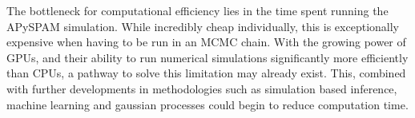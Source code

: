 The bottleneck for computational efficiency lies in the time spent running the APySPAM simulation. While incredibly cheap individually, this is exceptionally expensive when having to be run in an MCMC chain. With the growing power of GPUs, and their ability to run numerical simulations significantly more efficiently than CPUs, a pathway to solve this limitation may already exist. This, combined with further developments in methodologies such as simulation based inference, machine learning and gaussian processes could begin to reduce computation time.
